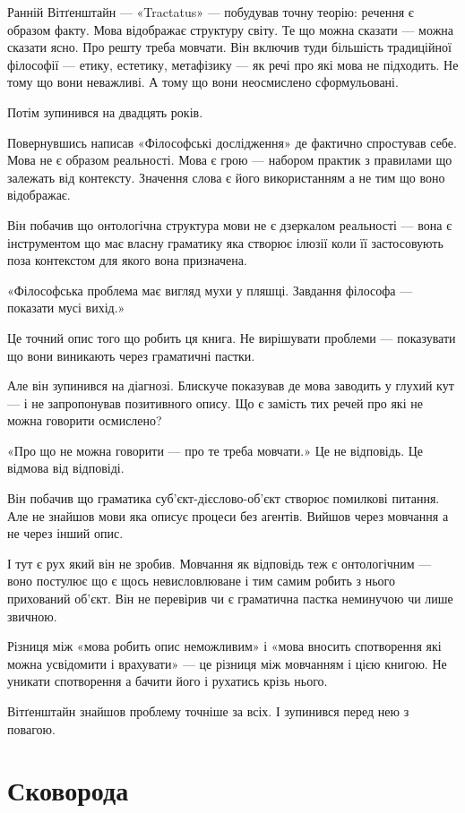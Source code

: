 \documentclass[12pt, a4paper, openany]{book}
\begin{document}
Ранній Вітґенштайн --- «Tractatus» --- побудував точну теорію: речення є образом факту. Мова відображає структуру світу. Те що можна сказати --- можна сказати ясно. Про решту треба мовчати. Він включив туди більшість традиційної філософії --- етику, естетику, метафізику --- як речі про які мова не підходить. Не тому що вони неважливі. А тому що вони неосмислено сформульовані.

Потім зупинився на двадцять років.

Повернувшись написав «Філософські дослідження» де фактично спростував себе. Мова не є образом реальності. Мова є грою --- набором практик з правилами що залежать від контексту. Значення слова є його використанням а не тим що воно відображає.

Він побачив що онтологічна структура мови не є дзеркалом реальності --- вона є інструментом що має власну граматику яка створює ілюзії коли її застосовують поза контекстом для якого вона призначена.

«Філософська проблема має вигляд мухи у пляшці. Завдання філософа --- показати мусі вихід.»

Це точний опис того що робить ця книга. Не вирішувати проблеми --- показувати що вони виникають через граматичні пастки.

Але він зупинився на діагнозі. Блискуче показував де мова заводить у глухий кут --- і не запропонував позитивного опису. Що є замість тих речей про які не можна говорити осмислено?

«Про що не можна говорити --- про те треба мовчати.» Це не відповідь. Це відмова від відповіді.

Він побачив що граматика суб'єкт-дієслово-об'єкт створює помилкові питання. Але не знайшов мови яка описує процеси без агентів. Вийшов через мовчання а не через інший опис.

І тут є рух який він не зробив. Мовчання як відповідь теж є онтологічним --- воно постулює що є щось невисловлюване і тим самим робить з нього прихований об'єкт. Він не перевірив чи є граматична пастка неминучою чи лише звичною.

Різниця між «мова робить опис неможливим» і «мова вносить спотворення які можна усвідомити і врахувати» --- це різниця між мовчанням і цією книгою. Не уникати спотворення а бачити його і рухатись крізь нього.

Вітґенштайн знайшов проблему точніше за всіх. І зупинився перед нею з повагою.

\section{Сковорода}
\end{document}
